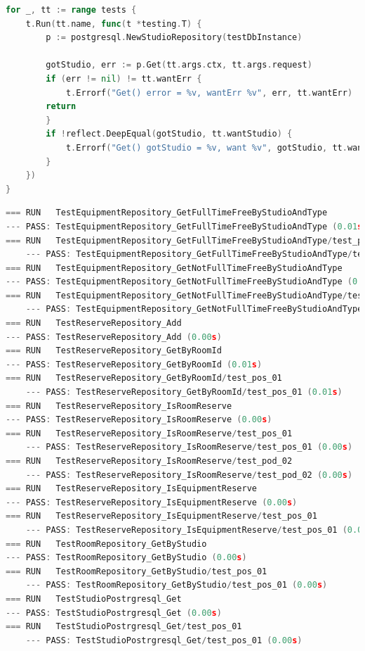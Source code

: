 \begin{appendices}
\begin{lstlisting}[language=go, label=lst:testing_code]
for _, tt := range tests {
	t.Run(tt.name, func(t *testing.T) {
		p := postgresql.NewStudioRepository(testDbInstance)

		gotStudio, err := p.Get(tt.args.ctx, tt.args.request)
		if (err != nil) != tt.wantErr {
			t.Errorf("Get() error = %v, wantErr %v", err, tt.wantErr)
		return
		}
		if !reflect.DeepEqual(gotStudio, tt.wantStudio) {
			t.Errorf("Get() gotStudio = %v, want %v", gotStudio, tt.wantStudio)
		}
	})
}
	\end{lstlisting}


\begin{lstlisting}[language=go, label=lst:testing_res]
=== RUN   TestEquipmentRepository_GetFullTimeFreeByStudioAndType
--- PASS: TestEquipmentRepository_GetFullTimeFreeByStudioAndType (0.01s)
=== RUN   TestEquipmentRepository_GetFullTimeFreeByStudioAndType/test_pos_01
	--- PASS: TestEquipmentRepository_GetFullTimeFreeByStudioAndType/test_pos_01 (0.01s)
=== RUN   TestEquipmentRepository_GetNotFullTimeFreeByStudioAndType
--- PASS: TestEquipmentRepository_GetNotFullTimeFreeByStudioAndType (0.01s)
=== RUN   TestEquipmentRepository_GetNotFullTimeFreeByStudioAndType/test_pos_01
	--- PASS: TestEquipmentRepository_GetNotFullTimeFreeByStudioAndType/test_pos_01 (0.01s)
=== RUN   TestReserveRepository_Add
--- PASS: TestReserveRepository_Add (0.00s)
=== RUN   TestReserveRepository_GetByRoomId
--- PASS: TestReserveRepository_GetByRoomId (0.01s)
=== RUN   TestReserveRepository_GetByRoomId/test_pos_01
	--- PASS: TestReserveRepository_GetByRoomId/test_pos_01 (0.01s)
=== RUN   TestReserveRepository_IsRoomReserve
--- PASS: TestReserveRepository_IsRoomReserve (0.00s)
=== RUN   TestReserveRepository_IsRoomReserve/test_pos_01
	--- PASS: TestReserveRepository_IsRoomReserve/test_pos_01 (0.00s)
=== RUN   TestReserveRepository_IsRoomReserve/test_pod_02
	--- PASS: TestReserveRepository_IsRoomReserve/test_pod_02 (0.00s)
=== RUN   TestReserveRepository_IsEquipmentReserve
--- PASS: TestReserveRepository_IsEquipmentReserve (0.00s)
=== RUN   TestReserveRepository_IsEquipmentReserve/test_pos_01
	--- PASS: TestReserveRepository_IsEquipmentReserve/test_pos_01 (0.00s)
=== RUN   TestRoomRepository_GetByStudio
--- PASS: TestRoomRepository_GetByStudio (0.00s)
=== RUN   TestRoomRepository_GetByStudio/test_pos_01
	--- PASS: TestRoomRepository_GetByStudio/test_pos_01 (0.00s)
=== RUN   TestStudioPostrgresql_Get
--- PASS: TestStudioPostrgresql_Get (0.00s)
=== RUN   TestStudioPostrgresql_Get/test_pos_01
	--- PASS: TestStudioPostrgresql_Get/test_pos_01 (0.00s)

\end{lstlisting}
\end{appendices}
